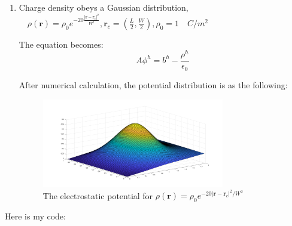 \documentclass[a4paper,11pt]{article}
\begin{document}
\begin{enumerate}
\begin{enumerate}
    \item Charge density obeys a Gaussian distribution,$\quad\rho(\boldsymbol{r})=\rho_0e^{-20\frac{|\boldsymbol{r}-\boldsymbol{r}_c|^2}{W^2}},\boldsymbol{r}_c=(\frac{L}{2},\frac{W}{2}),\rho_0=1\quad C/m^2$  
    
    The equation becomes:
    \begin{equation}
      A\phi^{h}=b^{h}-\dfrac{\rho^{h}}{\epsilon_0}
    \end{equation}

    After numerical calculation, the potential distribution is as the following:
    \begin{figure}[h]
      \centering
      \includegraphics[width=0.75\textwidth]{fig7.png}\caption{The electrostatic potential for $\rho(\boldsymbol{r})=\rho_0e^{-20|\boldsymbol{r}-\boldsymbol{r}_c|^2/W^2}$}
    \end{figure}
  \end{enumerate}
\end{enumerate}


Here is my code:

\end{document}
